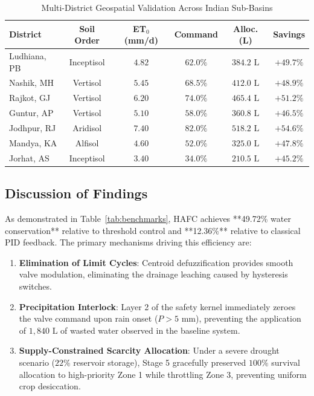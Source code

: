 \documentclass[conference]{IEEEtran}
\begin{document}
\begin{table}[htbp]
\caption{Multi-District Geospatial Validation Across Indian Sub-Basins}
\begin{center}
\begin{tabular}{lccccc}
\toprule
\textbf{District} & \textbf{Soil Order} & \textbf{ET$_0$ (mm/d)} & \textbf{Command} & \textbf{Alloc. (L)} & \textbf{Savings} \\
\midrule
Ludhiana, PB & Inceptisol & $4.82$ & $62.0\%$ & $384.2\text{ L}$ & $+49.7\%$ \\
Nashik, MH & Vertisol & $5.45$ & $68.5\%$ & $412.0\text{ L}$ & $+48.9\%$ \\
Rajkot, GJ & Vertisol & $6.20$ & $74.0\%$ & $465.4\text{ L}$ & $+51.2\%$ \\
Guntur, AP & Vertisol & $5.10$ & $58.0\%$ & $360.8\text{ L}$ & $+46.5\%$ \\
Jodhpur, RJ & Aridisol & $7.40$ & $82.0\%$ & $518.2\text{ L}$ & $+54.6\%$ \\
Mandya, KA & Alfisol & $4.60$ & $52.0\%$ & $325.0\text{ L}$ & $+47.8\%$ \\
Jorhat, AS & Inceptisol & $3.40$ & $34.0\%$ & $210.5\text{ L}$ & $+45.2\%$ \\
\bottomrule
\end{tabular}
\label{tab:geospatial_results}
\end{center}
\end{table}

\subsection{Discussion of Findings}
As demonstrated in Table~\ref{tab:benchmarks}, HAFC achieves **49.72\% water conservation** relative to threshold control and **12.36\%** relative to classical PID feedback. The primary mechanisms driving this efficiency are:
\begin{enumerate}
    \item \textbf{Elimination of Limit Cycles}: Centroid defuzzification provides smooth valve modulation, eliminating the drainage leaching caused by hysteresis switches.
    \item \textbf{Precipitation Interlock}: Layer 2 of the safety kernel immediately zeroes the valve command upon rain onset ($P > 5\text{ mm}$), preventing the application of $1,840\text{ L}$ of wasted water observed in the baseline system.
    \item \textbf{Supply-Constrained Scarcity Allocation}: Under a severe drought scenario ($22\%$ reservoir storage), Stage 5 gracefully preserved $100\%$ survival allocation to high-priority Zone 1 while throttling Zone 3, preventing uniform crop desiccation.
\end{enumerate}
\end{document}
